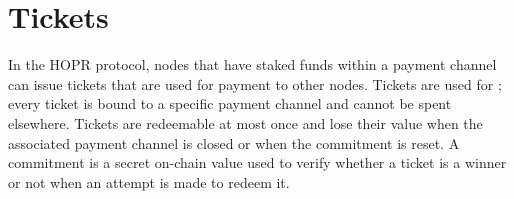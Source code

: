 \section{Tickets}
\label{sec:tickets}

In the HOPR protocol, nodes that have staked funds within a payment channel can issue tickets that are used for payment to other nodes. Tickets are used for ; every ticket is bound to a specific payment channel and cannot be spent elsewhere. Tickets are redeemable at most once and lose their value when the associated payment channel is closed or when the commitment is reset. A commitment is a secret on-chain value used to verify whether a ticket is a winner or not when an attempt is made to redeem it.

\begin{figure}[H]
      \centering
\end{figure}
